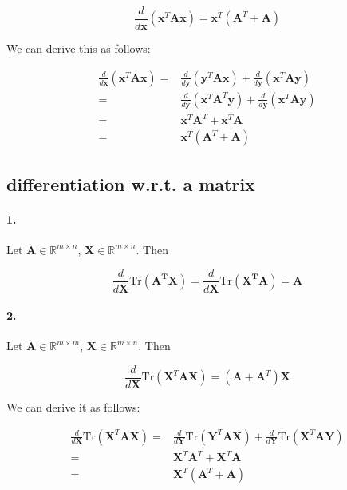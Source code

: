 \documentclass{article}
\begin{document}
\begin{equation} \label{eq:dA_dx}
    \frac{d}{d\mathbf{x}} (\mathbf{x}^{T}\mathbf{A}\mathbf{x}) = \mathbf{x}^T (\mathbf{A}^T + \mathbf{A})
\end{equation}

We can derive this as follows:

\[
\begin{split}
    \frac{d}{d\mathbf{x}} (\mathbf{x}^{T}\mathbf{A}\mathbf{x}) =& \frac{d}{d\mathbf{y}} (\mathbf{y}^{T}\mathbf{A}\mathbf{x}) + \frac{d}{d\mathbf{y}} (\mathbf{x}^{T}\mathbf{A}\mathbf{y})\\
    =& \frac{d}{d\mathbf{y}} (\mathbf{x}^{T}\mathbf{A}^T\mathbf{y}) + \frac{d}{d\mathbf{y}} (\mathbf{x}^T\mathbf{A}\mathbf{y})\\
    =& \mathbf{x}^T\mathbf{A}^T + \mathbf{x}^T\mathbf{A}\\
    =& \mathbf{x}^T (\mathbf{A}^T + \mathbf{A})
\end{split}
\]


\subsection{differentiation w.r.t. a matrix}

\paragraph{1.} Let $\mathbf{A} \in \mathbb{R}^{m\times n}$, $\mathbf{X} \in \mathbb{R}^{m\times n}$. Then

\begin{equation}
    \frac{d}{d\mathbf{X}}\text{Tr}(\mathbf{A^TX}) = \frac{d}{d\mathbf{X}}\text{Tr}(\mathbf{X^TA}) = \mathbf{A}
\end{equation}


\paragraph{2.} Let $\mathbf{A} \in \mathbb{R}^{m\times m}$, $\mathbf{X} \in \mathbb{R}^{m\times n}$. Then

\begin{equation}
    \frac{d}{d\mathbf{X}} \text{Tr}(\mathbf{X}^T \mathbf{A} \mathbf{X}) = (\mathbf{A} + \mathbf{A}^T) \mathbf{X}
\end{equation}

We can derive it as follows:

\[
\begin{split}
    \frac{d}{d\mathbf{X}} \text{Tr}(\mathbf{X}^T \mathbf{A} \mathbf{X}) =& \frac{d}{d\mathbf{Y}} \text{Tr}(\mathbf{Y}^T \mathbf{A} \mathbf{X}) + \frac{d}{d\mathbf{Y}} \text{Tr}(\mathbf{X}^T \mathbf{A} \mathbf{Y})\\
    =& \mathbf{X}^T \mathbf{A}^T + \mathbf{X}^T \mathbf{A}\\
    =& \mathbf{X}^T (\mathbf{A}^T + \mathbf{A})
\end{split}
\]
\end{document}

